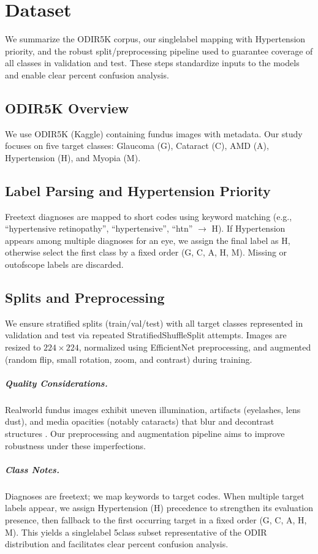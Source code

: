 \chapter{Dataset}\label{sec:dataset}
We summarize the ODIR\textendash 5K corpus, our single\textendash label mapping with Hypertension priority, and the robust split/preprocessing pipeline used to guarantee coverage of all classes in validation and test. These steps standardize inputs to the models and enable clear percent confusion analysis.
\section{ODIR\textendash 5K Overview}
We use ODIR\textendash 5K (Kaggle) \cite{odir5k} containing fundus images with metadata. Our study focuses on five target classes: Glaucoma (G), Cataract (C), AMD (A), Hypertension (H), and Myopia (M).

\section{Label Parsing and Hypertension Priority}
Free\textendash text diagnoses are mapped to short codes using keyword matching (e.g., ``hypertensive retinopathy'', ``hypertensive'', ``htn'' $\rightarrow$ H). If Hypertension appears among multiple diagnoses for an eye, we assign the final label as H, otherwise select the first class by a fixed order (G, C, A, H, M). Missing or out\textendash of\textendash scope labels are discarded.

\section{Splits and Preprocessing}
We ensure stratified splits (train/val/test) with all target classes represented in validation and test via repeated StratifiedShuffleSplit attempts. Images are resized to $224\times224$, normalized using EfficientNet preprocessing, and augmented (random flip, small rotation, zoom, and contrast) during training.

\paragraph{Quality Considerations.} Real\textendash world fundus images exhibit uneven illumination, artifacts (eyelashes, lens dust), and media opacities (notably cataracts) that blur and de\textendash contrast structures \cite{docxRef04,docxRef05}. Our preprocessing and augmentation pipeline aims to improve robustness under these imperfections.

\paragraph{Class Notes.} Diagnoses are free\textendash text; we map keywords to target codes. When multiple target labels appear, we assign Hypertension (H) precedence to strengthen its evaluation presence, then fallback to the first occurring target in a fixed order (G, C, A, H, M). This yields a single\textendash label 5\textendash class subset representative of the ODIR distribution and facilitates clear percent confusion analysis.

